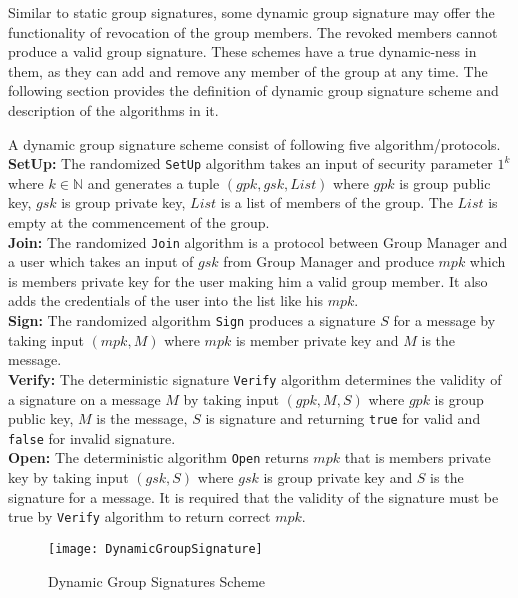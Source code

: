 Similar to static group signatures, some dynamic group signature may offer the functionality of revocation of the group members. The revoked members cannot produce a valid group signature. These schemes have a true dynamic-ness in them, as they can add and remove any member of the group at any time. The following section provides the definition of dynamic group signature scheme and description of the algorithms in it.

\begin{definition}A dynamic group signature scheme consist of following five algorithm/protocols.\\
\textbf{SetUp:} The randomized \texttt{SetUp} algorithm takes an input of security parameter $1^k$ where $k\in \mathbb{N}$ and generates a tuple $(gpk, gsk, List)$ where $gpk$ is group public key, $gsk$ is group private key, $List$ is a list of members of the group. The $List$ is empty at the commencement of the group.\\
\textbf{Join:} The randomized \texttt{Join} algorithm is a protocol between Group Manager and a user which takes an input of $gsk$ from Group Manager and produce $mpk$ which is members private key for the user making him a valid group member. It also adds the credentials of the user into the list like his $mpk$.\\
\textbf{Sign:} The randomized algorithm \texttt{Sign} produces a signature $S$ for a message by taking input $(mpk, M)$ where $mpk$ is member private key and $M$ is the message.\\
\textbf{Verify:} The deterministic signature \texttt{Verify} algorithm determines the validity of a signature on a message $M$ by taking input $(gpk, M, S)$ where $gpk$ is group public key, $M$ is the message, $S$ is signature and returning \texttt{true} for valid and \texttt{false} for invalid signature.\\
\textbf{Open:} The deterministic algorithm \texttt{Open} returns $mpk$ that is members private key by taking input $(gsk, S)$ where $gsk$ is group private key and $S$ is the signature for a message. It is required that the validity of the signature must be true by \texttt{Verify} algorithm to return correct $mpk$.
\end{definition}
\begin{figure}[h]
    \centering
    \texttt{[image: DynamicGroupSignature]}
    \caption{Dynamic Group Signatures Scheme}
    \label{fig:Dynamic Group Signatures Scheme}
\end{figure}
